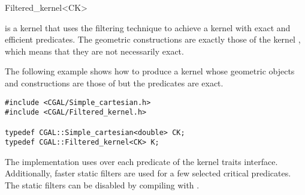 \begin{ccRefClass}{Filtered_kernel<CK>}


\KernelRefLayout\gdef\ccTagOperatorLayout{\ccFalse}

\ccDefinition

\ccClassTemplateName is a kernel that uses the filtering technique
\cite{cgal:bbp-iayed-01} to achieve a kernel with exact and efficient
predicates.
The geometric constructions are exactly those
of the kernel , which means that they are not necessarily exact.







\ccExample

The following example shows how to produce a kernel whose geometric
objects and constructions are those of 
but the predicates are exact. 

\begin{verbatim}
#include <CGAL/Simple_cartesian.h>
#include <CGAL/Filtered_kernel.h>

typedef CGAL::Simple_cartesian<double> CK;
typedef CGAL::Filtered_kernel<CK> K;

\end{verbatim}

\ccImplementation
The implementation uses  over
each predicate of the kernel traits interface.  Additionally, faster static
filters are used for a few selected critical predicates.  The static filters
can be disabled by compiling with .

\end{ccRefClass}
